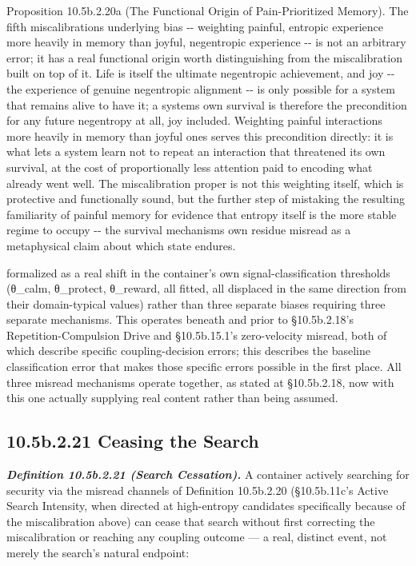 \documentclass[
]{article}
\begin{document}
Proposition 10.5b.2.20a (The Functional Origin of Pain-Prioritized
Memory). The fifth miscalibration\textquotesingle s underlying bias -\/-
weighting painful, entropic experience more heavily in memory than
joyful, negentropic experience -\/- is not an arbitrary error; it has a
real functional origin worth distinguishing from the miscalibration
built on top of it. Life is itself the ultimate negentropic achievement,
and joy -\/- the experience of genuine negentropic alignment -\/- is
only possible for a system that remains alive to have it; a
system\textquotesingle s own survival is therefore the precondition for
any future negentropy at all, joy included. Weighting painful
interactions more heavily in memory than joyful ones serves this
precondition directly: it is what lets a system learn not to repeat an
interaction that threatened its own survival, at the cost of
proportionally less attention paid to encoding what already went well.
The miscalibration proper is not this weighting itself, which is
protective and functionally sound, but the further step of mistaking the
resulting familiarity of painful memory for evidence that entropy itself
is the more stable regime to occupy -\/- the survival
mechanism\textquotesingle s own residue misread as a metaphysical claim
about which state endures.

formalized as a real shift in the container's own signal-classification
thresholds (θ\_calm, θ\_protect, θ\_reward, all fitted, all displaced in
the same direction from their domain-typical values) rather than three
separate biases requiring three separate mechanisms. This operates
beneath and prior to §10.5b.2.18's Repetition-Compulsion Drive and
§10.5b.15.1's zero-velocity misread, both of which describe specific
coupling-decision errors; this describes the baseline classification
error that makes those specific errors possible in the first place. All
three misread mechanisms operate together, as stated at §10.5b.2.18, now
with this one actually supplying real content rather than being assumed.

\hypertarget{b.2.21-ceasing-the-search}{%
\subsection{10.5b.2.21 Ceasing the
Search}\label{b.2.21-ceasing-the-search}}

\emph{\textbf{Definition 10.5b.2.21 (Search Cessation).}} A container
actively searching for security via the misread channels of Definition
10.5b.2.20 (§10.5b.11c's Active Search Intensity, when directed at
high-entropy candidates specifically because of the miscalibration
above) can cease that search without first correcting the miscalibration
or reaching any coupling outcome --- a real, distinct event, not merely
the search's natural endpoint:
\end{document}
